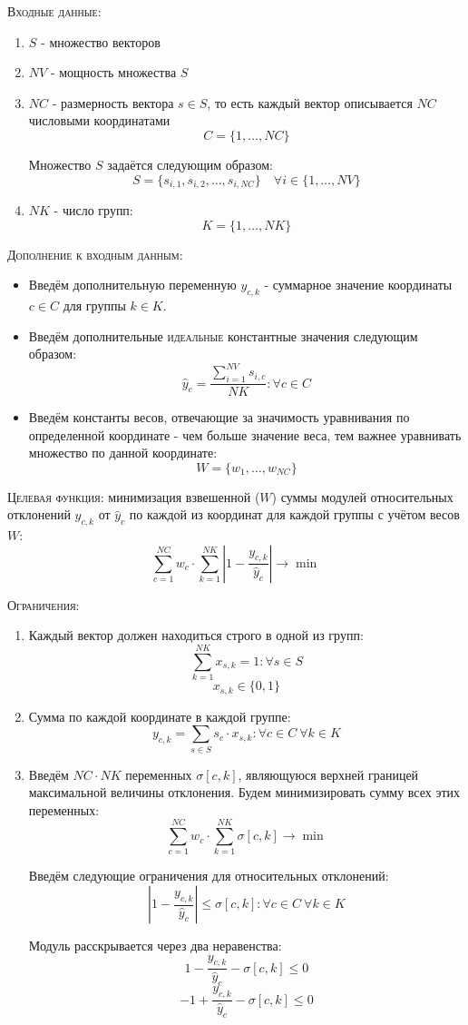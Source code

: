 \documentclass[%
10pt, %
final, %
oneside, %
onecolumn, %
centertags]{article} %
\theoremstyle{plain}
\theoremstyle{definition}
\theoremstyle{remark}
\begin{document}
\textsc{Входные данные}: 
\begin{enumerate}
	\item $S$ - множество векторов
	\item $NV$ - мощность множества $S$
	\item $NC$ - размерность вектора $s \in S$, то есть каждый вектор описывается $NC$ числовыми координатами
	$$C = \{1,\ldots,NC\}$$

	Множество $S$ задаётся следующим образом:
	$$S = \{s_{i,1},s_{i,2},\ldots,s_{i,NC}\} \quad \forall i \in \{1,\ldots,NV\}$$
	\item $NK$ - число групп:
	$$K = \{1,\ldots,NK\}$$
\end{enumerate}
\textsc{Дополнение к входным данным}:
\begin{itemize}
	\item Введём дополнительную переменную $y_{c,k}$ - суммарное значение координаты $c \in C$ для группы $k \in K$.
	\item Введём дополнительные \textsc{идеальные} константные значения следующим образом:
	$$\hat{y}_c = \frac{\sum\limits_{i=1}^{NV}s_{i,c}}{NK} : \forall c \in C$$
	\item Введём константы весов, отвечающие за значимость уравнивания по определенной координате - чем больше значение веса, тем важнее уравнивать множество по данной координате:
	$$W = \{w_1,\ldots,w_{NC}\}$$
\end{itemize}

\textsc{Целевая функция:} минимизация взвешенной ($W$) суммы модулей относительных отклонений $y_{c,k}$ от $\hat{y}_c$ по каждой из координат для каждой группы с учётом весов $W$:
$$\sum\limits_{c=1}^{NC} w_c \cdot \sum\limits_{k=1}^{NK} \left\vert 1 - \frac{y_{c,k}}{\hat{y}_c}\right\vert \to \min$$

\newpage
\textsc{Ограничения}:

\begin{enumerate}
	\item Каждый вектор должен находиться строго в одной из групп: 
	$$\sum\limits_{k=1}^{NK}x_{s,k} = 1 : \forall s \in S$$
	$$x_{s,k} \in \{0,1\}$$
	\item Сумма по каждой координате в каждой группе:
	$$y_{c,k} = \sum\limits_{s\in S} s_c \cdot x_{s,k}: \forall c \in C \  \forall k \in K$$
	\item Введём $NC\cdot NK$ переменных $\sigma[c,k]$, являющуюся верхней границей максимальной величины отклонения. Будем минимизировать сумму всех этих переменных:
	$$\sum\limits_{c=1}^{NC} w_c \cdot \sum\limits_{k=1}^{NK} \sigma[c,k] \to \min$$

	Введём следующие ограничения для относительных отклонений:
	$$\left\vert 1 - \frac{y_{c,k}}{\hat{y}_c}\right\vert \leq \sigma[c,k] : \forall c \in C \ \forall k \in K$$

	Модуль расскрывается через два неравенства:
	$$1 - \frac{y_{c,k}}{\hat{y}_c} - \sigma[c,k] \leq 0$$
	$$-1 + \frac{y_{c,k}}{\hat{y}_c} - \sigma[c,k] \leq 0$$ 
\end{enumerate}
\end{document}

